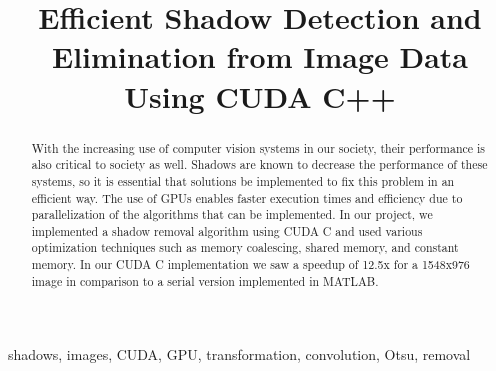 \documentclass[conference]{IEEEtran}
\begin{document}
   \title{Efficient Shadow Detection and Elimination from Image Data Using CUDA C++}
   \author
   {

      \and
      \and
   }
   \maketitle
   \begin{abstract}
      With the increasing use of computer vision systems in our society, their performance is also critical to society as well. Shadows are known to decrease the performance of these systems, so it is essential that solutions be implemented to fix this problem in an efficient way. The use of GPUs enables faster execution times and efficiency due to parallelization of the algorithms that can be implemented. In our project, we implemented a shadow removal algorithm using CUDA C and used various optimization techniques such as memory coalescing, shared memory, and constant memory. In our CUDA C implementation we saw a speedup of 12.5x for a 1548x976 image in comparison to a serial version implemented in MATLAB.
   \end{abstract}
   \begin{IEEEkeywords}
      shadows, images, CUDA, GPU, transformation, convolution, Otsu, removal
   \end{IEEEkeywords}
\end{document}
